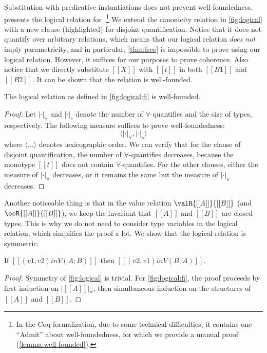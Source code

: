 Substitution with predicative instantiations does not prevent well-foundedness.
 presents the logical relation for \fnamee.\footnote{In the
  Coq formalization, due to some technical difficulties, it contains one
  ``Admit'' about well-foundedness, for which we provide a manual proof
  (\cref{lemma:well-founded}).} We extend the canonicity relation in
\cref{fig:logical} with a new clause (highlighted) for disjoint quantification.
Notice that it does not quantify over arbitrary relations, which means that our
logical relation \emph{does not} imply parametricity, and in particular,
\cref{thm:free} is impossible to prove using our logical relation. However, it
suffices for our purposes to prove coherence. Also notice that we directly
substitute $[[X]]$ with $[[t]]$ in both $[[B1]]$ and $[[B2]]$. It can be shown
that the relation is well-founded.

\begin{lemma} \label{lemma:well-founded}
  The logical relation as defined in \cref{fig:logical:fi} is well-founded.
\end{lemma}
\begin{proof}
  Let $| \cdot |_{\forall}$ and $| \cdot |_s$ denote the number of
  $\forall$-quantifies and the size of types, respectively. The following
  measure suffices to prove well-foundedness:
  \[
\langle | \cdot |_{\forall} ,  | \cdot |_s   \rangle
  \]
  where $\langle \dots \rangle$ denotes lexicographic order. We can verify that
  for the clause of disjoint quantification, the number of $\forall$-quantifies
  decreases, because the monotype $[[t]]$ does not contain $\forall$-quantifies.
  For the other clauses, either the measure of $| \cdot |_{\forall}$ decreases,
  or it remains the same but the measure of $| \cdot |_s$ decreases.
\end{proof}


Another noticeable thing is that in the value relation $ \valR{[[A]]}{[[B]]} $
(and $\eeR{[[A]]}{[[B]]} $), we keep the invariant that $[[A]]$ and $[[B]]$
are closed types. This is why we do not need to consider type variables in the
logical relation, which simplifies the proof a lot. We show that the logical
relation is symmetric.


\begin{lemma}
  If $[[ (v1, v2) in V ( A ; B ) ]]$ then $[[ (v2, v1) in V ( B ; A ) ]]$.
\end{lemma}
\begin{proof}
  Symmetry of \cref{fig:logical} is trivial. For \cref{fig:logical:fi}, the
  proof proceeds by first induction on $ | [[A]] |_{\forall} $, then simultaneous
  induction on the structures of $[[A]]$ and $[[B]]$.
\end{proof}

